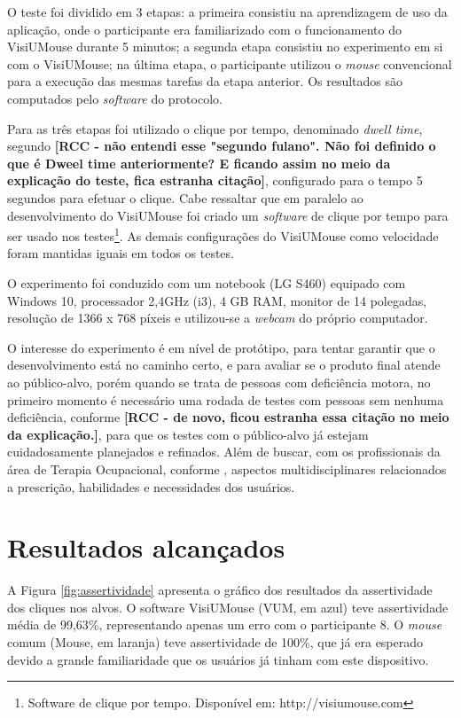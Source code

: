 O teste foi dividido em 3 etapas: a primeira consistiu na aprendizagem de uso da aplicação, onde o participante era familiarizado com o funcionamento do VisiUMouse durante 5 minutos; a segunda etapa consistiu no experimento em si com o VisiUMouse; na última etapa, o participante utilizou o \textit{mouse} convencional para a execução das mesmas tarefas da etapa anterior. Os resultados são computados pelo \textit{software} do protocolo.

Para as três etapas foi utilizado o clique por tempo, denominado \textit{dwell time}, segundo  \textbf{[RCC - não entendi esse "segundo fulano". Não foi definido o que é Dweel time anteriormente? E ficando assim no meio da explicação do teste, fica estranha citação]}, configurado para o tempo 5 segundos para efetuar o clique. Cabe ressaltar que em paralelo ao desenvolvimento do VisiUMouse foi criado um \textit{software} de clique por tempo para ser usado nos testes\footnote{Software de clique por tempo. Disponível em: http://visiumouse.com}. As demais configurações do VisiUMouse como velocidade foram mantidas iguais em todos os testes.  

O experimento foi conduzido com um notebook (LG S460) equipado com Windows 10, processador 2,4GHz (i3), 4 GB RAM, monitor de 14 polegadas, resolução de 1366 x 768 píxeis e utilizou-se a \textit{webcam} do próprio computador.

O interesse do experimento é em nível de protótipo, para tentar garantir que o desenvolvimento está no caminho certo, e para avaliar se o produto final atende ao público-alvo, porém quando se trata de pessoas com deficiência motora, no primeiro momento é necessário uma rodada de testes com pessoas sem nenhuma deficiência, conforme \cite{stone2005user} \textbf{[RCC - de novo, ficou estranha essa citação no meio da explicação.]}, para que os testes com o público-alvo já estejam cuidadosamente planejados e refinados. Além de buscar, com os profissionais da área de Terapia Ocupacional, conforme \cite{oliveira2015uso}, aspectos multidisciplinares relacionados a prescrição, habilidades e necessidades dos usuários.

\section{Resultados alcançados}\label{Sub:resultados-ex-1}
A Figura \ref{fig:assertividade} apresenta o gráfico dos resultados da assertividade dos cliques nos alvos. O software VisiUMouse (VUM, em azul) teve assertividade média de 99,63\%, representando apenas um erro com o participante 8. O \textit{mouse} comum (Mouse, em laranja) teve assertividade de 100\%, que já era esperado devido a grande familiaridade que os usuários já tinham com este dispositivo.

